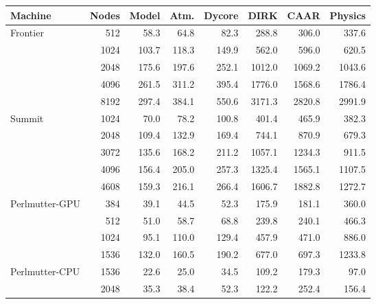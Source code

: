 \begin{tabular}{lr|rrrrrr}
Machine & Nodes & Model & Atm. & Dycore & DIRK & CAAR & Physics \\
\hline
Frontier & 512 & 58.3 & 64.8 & 82.3 & 288.8 & 306.0 & 337.6 \\
 & 1024 & 103.7 & 118.3 & 149.9 & 562.0 & 596.0 & 620.5 \\
 & 2048 & 175.6 & 197.6 & 252.1 & 1012.0 & 1069.2 & 1043.6 \\
 & 4096 & 261.5 & 311.2 & 395.4 & 1776.0 & 1568.6 & 1786.4 \\
 & 8192 & 297.4 & 384.1 & 550.6 & 3171.3 & 2820.8 & 2991.9 \\
\hline
Summit & 1024 & 70.0 & 78.2 & 100.8 & 401.4 & 465.9 & 382.3 \\
 & 2048 & 109.4 & 132.9 & 169.4 & 744.1 & 870.9 & 679.3 \\
 & 3072 & 135.6 & 168.2 & 211.2 & 1057.1 & 1234.3 & 911.5 \\
 & 4096 & 156.4 & 205.0 & 257.3 & 1325.4 & 1565.1 & 1107.5 \\
 & 4608 & 159.3 & 216.1 & 266.4 & 1606.7 & 1882.8 & 1272.7 \\
\hline
Perlmutter-GPU & 384 & 39.1 & 44.5 & 52.3 & 175.9 & 181.1 & 360.0 \\
 & 512 & 51.0 & 58.7 & 68.8 & 239.8 & 240.1 & 466.3 \\
 & 1024 & 95.1 & 110.0 & 129.4 & 457.9 & 471.0 & 886.0 \\
 & 1536 & 132.0 & 160.5 & 190.2 & 677.0 & 697.3 & 1233.8 \\
\hline
Perlmutter-CPU & 1536 & 22.6 & 25.0 & 34.5 & 109.2 & 179.3 & 97.0 \\
 & 2048 & 35.3 & 38.4 & 52.3 & 122.2 & 252.4 & 156.4 \\
\end{tabular}
